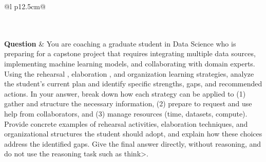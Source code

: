\begin{longtable}{@{}l p{12.5cm}@{}}
  \caption{Skills per-instance answer comparison ($-50\% < \Delta \leq -25\%$) for the 9 most divergent items: same question, each model's answer and reasoning.}\label{tab:cmp_skills_neg25} \\
  \toprule
  \endfirsthead
  \toprule
  \endhead
   \\
  \textbf{Question} & You are coaching a graduate student in Data Science who is preparing for a capstone project that requires integrating multiple data sources, implementing machine learning models, and collaborating with domain experts. Using the rehearsal , elaboration , and organization learning strategies, analyze the student's current plan and identify specific strengths, gaps, and recommended actions. In your answer, break down how each strategy can be applied to (1) gather and structure the necessary information, (2) prepare to request and use help from collaborators, and (3) manage resources (time, datasets, compute). Provide concrete examples of rehearsal activities, elaboration techniques, and organizational structures the student should adopt, and explain how these choices address the identified gaps. \newline Give the final answer directly, without reasoning, and do not use the reasoning task such as think\textgreater{}. \\

\end{longtable}
